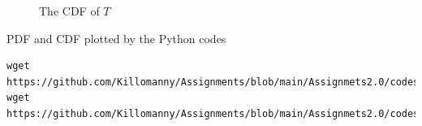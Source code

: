 \documentclass[journal,12pt,twocolumn]{IEEEtran}
\renewcommand\thesection{\arabic{section}}
\begin{document}
\begin{enumerate}[label=\thesection.\arabic*
,ref=\thesection.\theenumi]
\begin{figure}[h!]
    \caption{The CDF of $T$}
    \label{fig:my_label}
\end{figure}
PDF and CDF plotted by the Python codes
\begin{lstlisting}
wget https://github.com/Killomanny/Assignments/blob/main/Assignmets2.0/codes/4.5pdf.py
wget https://github.com/Killomanny/Assignments/blob/main/Assignmets2.0/codes/4.5cdf.py
\end{lstlisting}
\end{enumerate}
\end{document}

